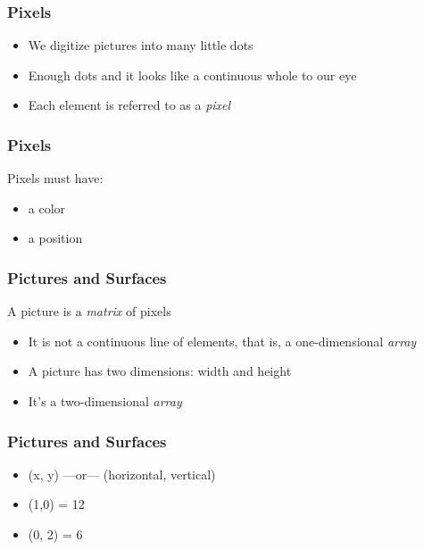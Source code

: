 
\begin{frame}
	\frametitle{Pixels}
	\begin{itemize}
		\item We digitize pictures into many little dots
		\item Enough dots and it looks like a continuous whole to our eye
		\item Each element is referred to as a \textit{pixel}
	\end{itemize}
\end{frame}

\begin{frame}
	\frametitle{Pixels}
	
	Pixels must have:
	
	\begin{itemize}
		\item a color
		\item a position
	\end{itemize}
\end{frame}

\begin{frame}
	\frametitle{Pictures and Surfaces}
	
	A picture is a \textit{matrix} of pixels
	
	\begin{itemize}
		\item It is not a continuous line of elements, that is, a one-dimensional \textit{array}
		\item A picture has two dimensions: width and height
		\item It's a two-dimensional \textit{array}
	\end{itemize}
\end{frame}



\begin{frame}
	\frametitle{Pictures and Surfaces}
	
	\begin{itemize}
		\item (x, y) ---or--- (horizontal, vertical)
		\item (1,0) = 12
		\item (0, 2) = 6
	\end{itemize}
\end{frame}

